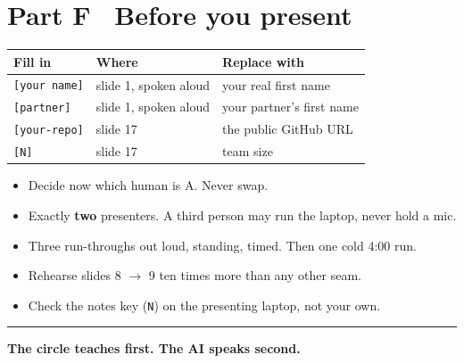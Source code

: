\documentclass[11pt,a4paper]{article}
\begin{document}
\section{Part F \textbullet\ Before you present}

\medskip
\noindent
\begin{tabularx}{\linewidth}{@{}lXl@{}}
\toprule
\textbf{Fill in} & \textbf{Where} & \textbf{Replace with} \\
\midrule
\texttt{[your name]} & slide 1, spoken aloud & your real first name \\
\texttt{[partner]} & slide 1, spoken aloud & your partner's first name \\
\texttt{[your-repo]} & slide 17 & the public GitHub URL \\
\texttt{[N]} & slide 17 & team size \\
\bottomrule
\end{tabularx}

\medskip
\begin{itemize}[leftmargin=1.1em,itemsep=1pt,topsep=2pt]
\item Decide now which human is A. Never swap.
\item Exactly \textbf{two} presenters. A third person may run the laptop, never hold a mic.
\item Three run-throughs out loud, standing, timed. Then one cold 4:00 run.
\item Rehearse slides 8 $\rightarrow$ 9 ten times more than any other seam.
\item Check the notes key (\texttt{N}) on the presenting laptop, not your own.
\end{itemize}

\medskip
{\color{colA}\rule{\linewidth}{1.2pt}}\par\smallskip
{\large\bfseries The circle teaches first. The AI speaks second.}
\end{document}
